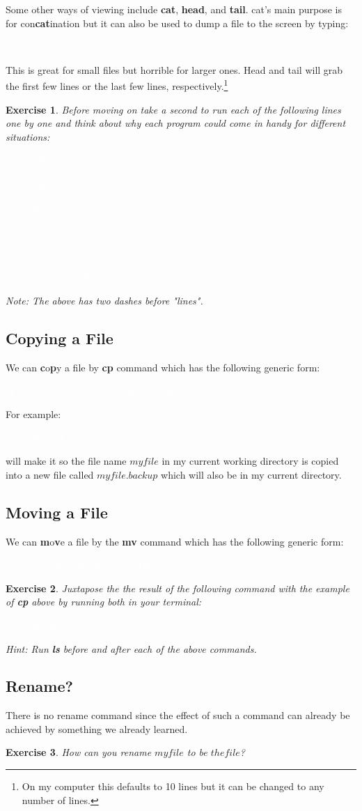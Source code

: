 \documentclass{book}
\newcommand{\commandline}[1]{\begin{center} \colorbox{Dark}{\textcolor{white}{#1}} \end{center}}
\newtheorem{ex}{Exercise}[chapter]
\begin{document}
Some other ways of viewing include \textbf{cat}, \textbf{head}, and \textbf{tail}. cat's main purpose is for con\textbf{cat}ination but it can also be used to dump a file to the screen by typing:
\commandline{cat myfile}
This is great for small files but horrible for larger ones. Head and tail will grab the first few lines or the last few lines, respectively.\footnote{On my computer this defaults to 10 lines but it can be changed to any number of lines.}
\begin{ex}
Before moving on take a second to run each of the following lines one by one and think about why each program could come in handy for different situations:
\commandline{less myfile}
\commandline{more myfile}
\commandline{cat myfile}
\commandline{head myfile}
\commandline{tail myfile}
\commandline{head --lines=2 myfile}
Note: The above has two dashes before "lines". 
\end{ex}

\subsection{Copying a File}
We can \textbf{c}o\textbf{p}y a file by \textbf{cp} command which has the following generic form:
\commandline{cp sourceFileName distinationFileName}
For example:
\commandline{cp myfile myfile.backup}
will make it so the file name $myfile$ in my current working directory is copied into a new file called $myfile.backup$ which will also be in my current directory.

\subsection{Moving a File}
We can \textbf{m}o\textbf{v}e a file by the \textbf{mv} command which has the following generic form:
\commandline{mv sourceFileName distinationFileName}
\begin{ex}
Juxtapose the the result of the following command with the example of \textbf{cp} above by running both in your terminal:
\commandline{mv myfile.backup myfile.backup2}
Hint: Run \textbf{ls} before and after each of the above commands.
\end{ex}

\subsection{Rename?}
There is no rename command since the effect of such a command can already be achieved by something we already learned.
\begin{ex}
	How can you rename $myfile$ to be $thefile$?
\end{ex}	
\end{document}

